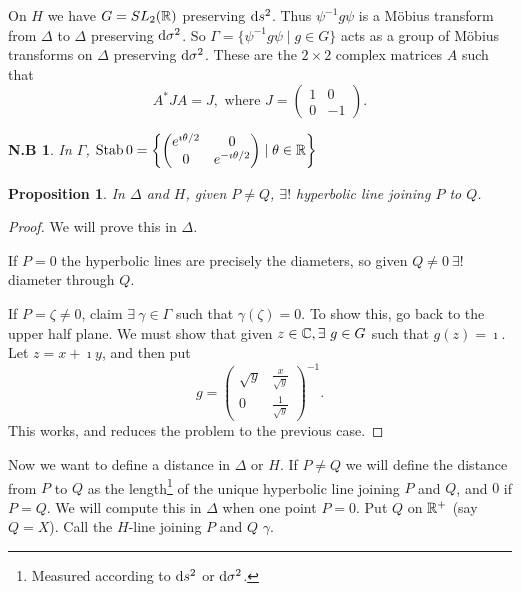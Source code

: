 \documentclass{notes}
\theoremstyle{plain}
\newtheorem{proposition}{Proposition}[chapter]
\newtheorem*{notes}{N.B}
\DeclareMathOperator{\Stab}{Stab}
\begin{document}
On $H$ we have $G = SL_2(\mathbb{R})$ preserving $\mathrm{d} s^2$.  Thus $\psi^{-1} g \psi$
is a M\"obius transform from $\Delta$ to $\Delta$ preserving $\mathrm{d}\sigma^2$.  So
$\Gamma = \{ \psi^{-1} g \psi \mid g \in G \}$ acts as a group of M\"obius
transforms on $\Delta$ preserving $\mathrm{d}\sigma^2$.  These are the $2 \times 2$
complex matrices $A$ such that
\[
A^* J A = J,\text{ where } J = \left( \begin{matrix}
1 & 0 \\ 0 & -1
\end{matrix}\right).
\]

\begin{notes}
In $\Gamma$, $\Stab 0 = \left\{ \left( \begin{matrix}
e^{\imath \theta/2} & 0 \\ 0 & e^{-\imath \theta/2}
\end{matrix}\right) \mid \theta \in \R \right\}$
\end{notes}

\begin{proposition}
In $\Delta$ and $H$, given $P \neq Q$, $\exists!$ hyperbolic line joining
$P$ to $Q$.
\end{proposition}

\begin{proof}
We will prove this in $\Delta$.

If $P=0$ the hyperbolic lines are precisely the diameters, so given $Q \neq 0\
\exists!$ diameter through $Q$. 

If $P = \zeta \neq 0$, claim $\exists\ \gamma \in \Gamma$ such that
$\gamma(\zeta) = 0$.  To show this, go back to the upper half plane.  We
must show that given $z \in \mathbb{C}, \exists\ g \in G$ such that $g(z) = \imath$.
Let $z = x + \imath y$, and then put
\[
g = \left( 
\begin{matrix}
\sqrt{y} & \frac{x}{\sqrt{y}} \\
0 & \frac{1}{\sqrt{y}}
\end{matrix}
\right)^{-1}.
\]
This works, and reduces the problem to the previous case.
\end{proof}

Now we want to define a distance in $\Delta$ or $H$.  If $P \neq Q$ we will
define the distance from $P$ to $Q$ as the length\footnote{Measured according
to $\mathrm{d} s^2$ or $\mathrm{d}\sigma^2$.} of the unique hyperbolic line joining $P$ and $Q$,
and $0$ if $P = Q$.  We will compute this in $\Delta$ when one point $P = 0$.
Put $Q$ on $\mathbb{R}^+$ (say $Q = X$).  Call the $H$-line joining $P$ and $Q$
$\gamma$.
\end{document}
